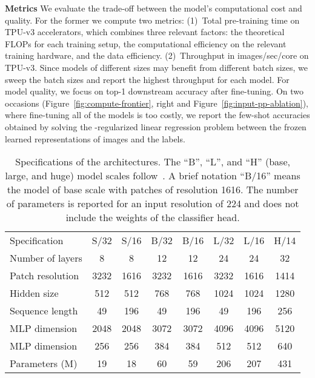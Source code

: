 {\bf Metrics\;\;}
We evaluate the trade-off between the model's
computational cost and quality.
For the former we compute two metrics:
(1)~Total pre-training time on TPU-v3 accelerators, which combines three relevant factors: the theoretical FLOPs for each training setup, the computational efficiency on the relevant training hardware, and the data efficiency.
(2)~Throughput in images/sec/core on TPU-v3. Since models of different sizes may benefit from different batch sizes, we sweep the batch sizes
and report the highest throughput for each model.
For model quality, we focus on top-1 downstream accuracy after fine-tuning.
On two occasions (Figure~\ref{fig:compute-frontier}, right and Figure~\ref{fig:input-pp-ablation}), where fine-tuning all of the models is too costly, we report the few-shot accuracies obtained by solving the -regularized linear regression problem between the frozen learned representations of images and the labels.

\newcommand{\pf}{\phantom{5}}

\begin{table}[tb]
  \caption{Specifications of the \name{} architectures.
  The ``B'', ``L'', and ``H'' (base, large, and huge) model scales follow~\citet{Dosovitskiy2021}.
  A brief notation ``B/16'' means the model of base scale with patches of resolution 1616.
  The number of parameters is reported for an input resolution of 224 and does not include the weights of the classifier head.
  }
  \medskip
  \label{table:architecture-configs}
  \centering
  \small
  \begin{tabular}{@{}lccccccc@{}}
    \toprule
    Specification & S/32 & S/16 & B/32 & B/16 & L/32 & L/16 & H/14\\
    \cmidrule{1-8}
    Number of layers & 8 & 8 & 12 & 12 & 24 & 24 & 32\\
    Patch resolution  & 3232 & 1616 & 3232 & 1616 & 3232 & 1616 & 1414\\
    Hidden size  & 512 & 512 & 768 & 768 & 1024 & 1024 & 1280\\
    Sequence length  & 49 & 196 & 49 & 196 & 49 & 196 & 256\\
    MLP dimension  & 2048 & 2048 & 3072 & 3072 & 4096 & 4096 & 5120\\
    MLP dimension  & 256 & 256 & 384 & 384 & 512 & 512 & 640\\
    Parameters (M) & 19 & 18 & 60 & 59 & 206 & 207 & 431\\
    \bottomrule
  \end{tabular}
  \vspace{-.2cm} \end{table}

